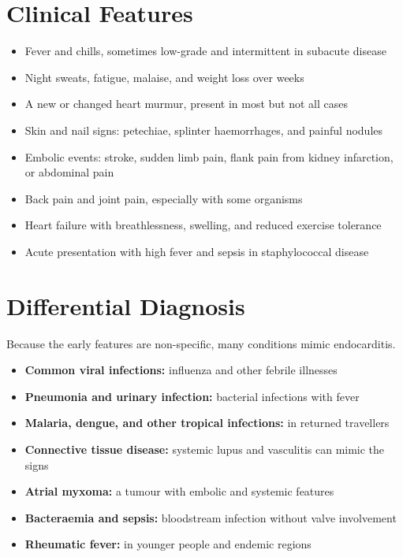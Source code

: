 \section*{Clinical Features}
\begin{itemize}
    \item Fever and chills, sometimes low-grade and intermittent in subacute disease
    \item Night sweats, fatigue, malaise, and weight loss over weeks
    \item A new or changed heart murmur, present in most but not all cases
    \item Skin and nail signs: petechiae, splinter haemorrhages, and painful nodules
    \item Embolic events: stroke, sudden limb pain, flank pain from kidney infarction, or abdominal pain
    \item Back pain and joint pain, especially with some organisms
    \item Heart failure with breathlessness, swelling, and reduced exercise tolerance
    \item Acute presentation with high fever and sepsis in staphylococcal disease
\end{itemize}

\section*{Differential Diagnosis}
Because the early features are non-specific, many conditions mimic endocarditis.
\begin{itemize}
    \item \textbf{Common viral infections:} influenza and other febrile illnesses
    \item \textbf{Pneumonia and urinary infection:} bacterial infections with fever
    \item \textbf{Malaria, dengue, and other tropical infections:} in returned travellers
    \item \textbf{Connective tissue disease:} systemic lupus and vasculitis can mimic the signs
    \item \textbf{Atrial myxoma:} a tumour with embolic and systemic features
    \item \textbf{Bacteraemia and sepsis:} bloodstream infection without valve involvement
    \item \textbf{Rheumatic fever:} in younger people and endemic regions
\end{itemize}

